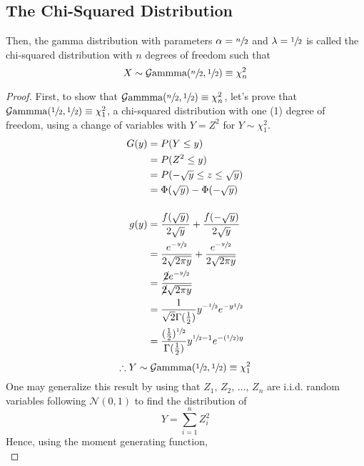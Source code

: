 \documentclass[12pt]{article}
\newcommand{\G}{\mathcal{G}}
\newcommand{\N}{\mathcal{N}}
\begin{document}
\pagebreak
\subsection{The Chi-Squared Distribution}
Then, the gamma distribution with parameters $\alpha=\sfrac{n}{2}$ and $\lambda=\sfrac{1}{2}$ is called the
chi-squared distribution with $n$ degrees of freedom such that
\begin{equation*}
	X\sim\G\text{ammma}(\sfrac{n}{2}, \sfrac{1}{2})\equiv\chi^2_n
\end{equation*}
\begin{proof}
	First, to show that $\G\text{ammma}(\sfrac{n}{2},\sfrac{1}{2})\equiv\chi^2_n$, let's prove that
	$\G\text{ammma}(\sfrac{1}{2},\sfrac{1}{2})\equiv\chi^2_1$, a chi-squared distribution with one (1) degree of
	freedom, using a change of variables with $Y=Z^2$ for $Y\sim\chi^2_1$.
	\begin{equation*}\label{eq:relation:chisquared:1}
		\begin{split}
			G(y)	&=	P(Y\leq y)\\
					&=	P(Z^2\leq y)\\
					&=	P(-\sqrt{y}\leq z \leq \sqrt{y})\\
					&=	\Phi(\sqrt{y})-\Phi(-\sqrt{y})\\[12pt]
			g(y)	&=	\frac{f(\sqrt{y})}{2\sqrt{y}}+\frac{f(-\sqrt{y})}{2\sqrt{y}}\\
					&=	\frac{e^{-\sfrac{y}{2}}}{2\sqrt{2\pi y}} + \frac{e^{-\sfrac{y}{2}}}{2\sqrt{2\pi y}}\\
					&=	\frac{\cancel{2}e^{-\sfrac{y}{2}}}{\cancel{2}\sqrt{2\pi y}}\\
					&=	\frac{1}{\sqrt{2}\Gamma(\frac{1}{2})}y^{-\sfrac{1}{2}}e^{-y\sfrac{1}{2}}\\
					&=	\frac{(\frac{1}{2})^{\sfrac{1}{2}}}{\Gamma(\frac{1}{2})}y^{\sfrac{1}{2}-1}e^{-(\sfrac{1}{2})y}
			\end{split}
	\end{equation*}
	\begin{equation*}
		\therefore Y\sim\G\text{ammma}(\sfrac{1}{2}, \sfrac{1}{2})\equiv\chi^2_1
	\end{equation*}
	One may generalize this result by using that $Z_1,\,Z_2,\,\ldots,\,Z_n$ are i.i.d. random variables following $\N(0,
	1)$ to find the distribution of
	\begin{equation*}
		Y = \sum^n_{i=1}Z^2_i
	\end{equation*}
	Hence, using the moment generating function,
	\begin{equation*}\label{eq:relation:chisquared:n}

\end{equation*}
\end{proof}
\end{document}
